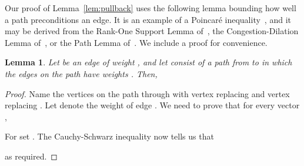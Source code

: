 \documentclass[11pt]{article}
\newtheorem{lemma}[theorem]{Lemma}
\begin{document}
Our proof of Lemma~\ref{lem:pullback} uses the following lemma bounding
  how well a path preconditions an edge.
It is an example of a Poincar{\'e} inequality~\cite{DiaconisStrook},
  and it may be derived from  the
  Rank-One Support Lemma of~\cite{SupportTheory},
  the Congestion-Dilation Lemma of~\cite{SupportGraph},
  or the Path Lemma of~\cite{SpielmanTengLinsolve}.
We include a proof for convenience.
\begin{lemma}\label{lem:Path}
Let  be an edge of weight ,
  and let  consist of a path from  to  in which
  the edges on the path have weights
  .
Then,

\end{lemma}
\begin{proof}
Name the vertices on the path  through  with vertex 
  replacing  and vertex  replacing .
Let  denote the weight of edge .
We need to prove that for every vector ,

For  set .
The Cauchy-Schwarz inequality now tells us that

as required.
\end{proof}
\end{document}
